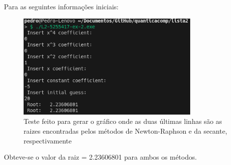\documentclass[12pt, a4paper]{article} %
\begin{document}
            Para as seguintes informa\c{c}\~oes iniciais:
            \begin{figure}[H]
                \centering
                \includegraphics[width=0.8\textwidth]{../images/results-ex-2-20.png}
                \caption{Teste feito para gerar o gr\'afico onde as duas \'ultimas linhas s\~ao as raizes encontradas pelos m\'etodos de Newton-Raphson e da secante, respectivamente}
            \end{figure}
            Obteve-se o valor da raiz = 2.23606801 para ambos os m\'etodos.
\end{document}
